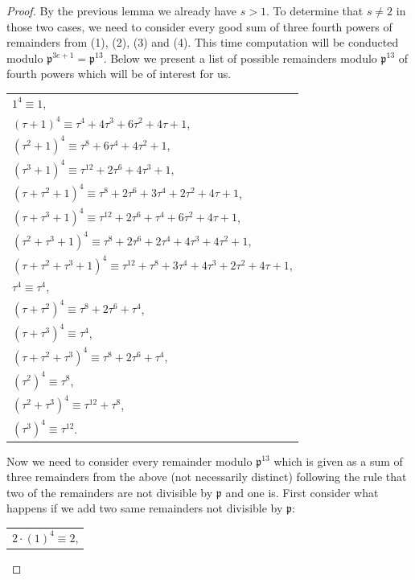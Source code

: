 \documentclass[12pt]{article}
\theoremstyle{remark}
\begin{document}
\begin{proof} By the previous lemma we already have $s>1$. To determine that $s \neq 2$ in those two cases, we need to consider every good sum of three fourth powers of remainders from (1), (2), (3) and (4). This time computation will be conducted modulo $\mathfrak{p}^{3e+1} = \mathfrak{p}^{13}$. Below we present a list of possible remainders modulo $\mathfrak{p}^{13}$ of fourth powers which will be of interest for us.
\begin{center}
\begin{tabular}{@{}l@{}}
    $1^4 \equiv 1$,\\
    $(\tau+1)^4 \equiv \tau^4 + 4\tau^3 + 6\tau^2 + 4\tau +1$,\\
    $(\tau^2+1)^4 \equiv \tau^8 + 6\tau^4 + 4\tau^2 + 1$,\\
    $(\tau^3+1)^4 \equiv \tau^{12} + 2\tau^6 + 4\tau^3 + 1$,\\
    $(\tau + \tau^2 + 1)^4 \equiv \tau^8 + 2\tau^6 + 3\tau^4 + 2\tau^2 + 4\tau + 1$,\\
    $(\tau + \tau^3 + 1)^4 \equiv \tau^{12} + 2\tau^6 + \tau^4 + 6\tau^2 + 4\tau +1$,\\
    $(\tau^2 + \tau^3 + 1)^4 \equiv \tau^8+2\tau^6+2\tau^4+4\tau^3+4\tau^2+1$,\\
    $(\tau + \tau^2 + \tau^3 + 1)^4 \equiv \tau^{12}+\tau^8+3\tau^4+4\tau^3+2\tau^2+4\tau+1$,\\
    $\tau^4 \equiv \tau^4$,\\
    $(\tau + \tau^2)^4 \equiv \tau^8 + 2\tau^6+ \tau^4$,\\
    $(\tau + \tau^3)^4 \equiv \tau^4$,\\
    $(\tau+\tau^2+\tau^3)^4 \equiv \tau^8+2\tau^6+\tau^4$, \\
    $(\tau^2)^4 \equiv \tau^8$,\\
    $(\tau^2 + \tau^3)^4 \equiv \tau^{12} +\tau^8 $,\\
    $(\tau^3)^4 \equiv \tau^{12}$.
\end{tabular}
\end{center}
Now we need to consider every remainder modulo $\mathfrak{p}^{13}$ which is given as a sum of three remainders from the above (not necessarily distinct) following the rule that two of the remainders are not divisible by $\mathfrak{p}$ and one is. First consider what happens if we add two same remainders not divisible by $\mathfrak{p}$:
\begin{center}
\begin{tabular}{@{}l@{}}
    $2 \cdot (1)^4 \equiv 2$,\\

\end{tabular}
\end{center}
\end{proof}
\end{document}
